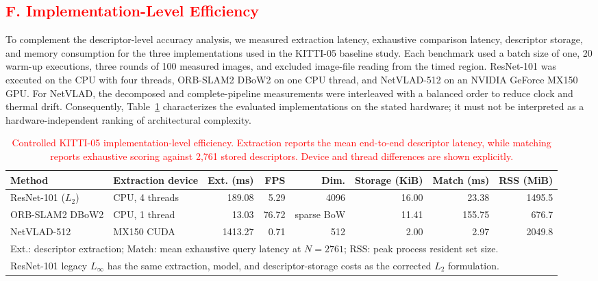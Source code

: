 \documentclass{ieeeaccess}
\begin{document}
{\color{red}
\subsection*{\textcolor{red}{F. Implementation-Level Efficiency}}
\label{subsec:kitti05_efficiency}

To complement the descriptor-level accuracy analysis, we measured extraction latency, exhaustive comparison latency, descriptor storage, and memory consumption for the three implementations used in the KITTI-05 baseline study. Each benchmark used a batch size of one, 20 warm-up executions, three rounds of 100 measured images, and excluded image-file reading from the timed region. ResNet-101 was executed on the CPU with four threads, ORB-SLAM2 DBoW2 on one CPU thread, and NetVLAD-512 on an NVIDIA GeForce MX150 GPU. For NetVLAD, the decomposed and complete-pipeline measurements were interleaved with a balanced order to reduce clock and thermal drift. Consequently, Table~\ref{tab:kitti05_efficiency} characterizes the evaluated implementations on the stated hardware; it must not be interpreted as a hardware-independent ranking of architectural complexity.

\begin{table}[!t]
\color{red}
\caption{\textcolor{red}{Controlled KITTI-05 implementation-level efficiency. Extraction reports the mean end-to-end descriptor latency, while matching reports exhaustive scoring against 2,761 stored descriptors. Device and thread differences are shown explicitly.}}
\label{tab:kitti05_efficiency}
\centering
\scriptsize
\setlength{\tabcolsep}{3.2pt}
\begin{tabular}{l l r r r r r r}
\toprule
Method & Extraction device & Ext. (ms) & FPS & Dim. & Storage (KiB) & Match (ms) & RSS (MiB) \\
\midrule
ResNet-101 ($L_2$) &
CPU, 4 threads &
189.08 &
5.29 &
4096 &
16.00 &
23.38 &
1495.5 \\
ORB-SLAM2 DBoW2 &
CPU, 1 thread &
13.03 &
76.72 &
sparse BoW &
11.41 &
155.75 &
676.7 \\
NetVLAD-512 &
MX150 CUDA &
1413.27 &
0.71 &
512 &
2.00 &
2.97 &
2049.8 \\
\bottomrule
\multicolumn{8}{l}{\footnotesize Ext.: descriptor extraction; Match: mean exhaustive query latency at $N=2761$; RSS: peak process resident set size.} \\
\multicolumn{8}{l}{\footnotesize ResNet-101 legacy $L_\infty$ has the same extraction, model, and descriptor-storage costs as the corrected $L_2$ formulation.} \\
\end{tabular}
\end{table}

}
\end{document}
